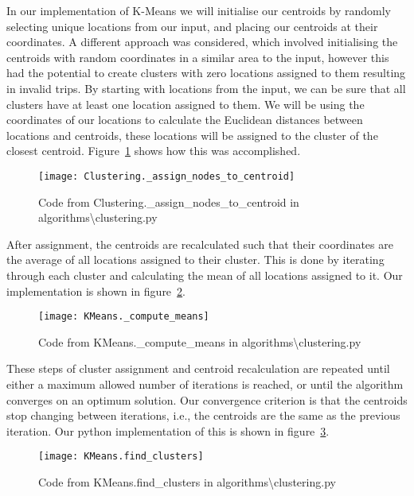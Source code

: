 \noindent
In our implementation of K-Means we will initialise our centroids by randomly selecting unique locations from our
input, and placing our centroids at their coordinates.
A different approach was considered, which involved initialising the centroids with random coordinates in a similar
area to the input, however this had the potential to create clusters with zero locations assigned to them resulting
in invalid trips.
By starting with locations from the input, we can be sure that all clusters have at least one location assigned to them.
We will be using the coordinates of our locations to calculate the Euclidean distances between locations and centroids,
these locations will be assigned to the cluster of the closest centroid.
Figure~\ref{fig:Clustering._assign_nodes_to_centroid} shows how this was accomplished.
\begin{figure}[H]
    \centering
    \texttt{[image: Clustering.\_assign\_nodes\_to\_centroid]}
    \caption{Code from Clustering.\_assign\_nodes\_to\_centroid in algorithms\textbackslash clustering.py}
    \label{fig:Clustering._assign_nodes_to_centroid}
\end{figure}

\noindent
After assignment, the centroids are recalculated such that their coordinates are the average of all locations
assigned to their cluster.
This is done by iterating through each cluster and calculating the mean of all locations assigned to it.
Our implementation is shown in figure~\ref{fig:KMeans._compute_means}.
\begin{figure}[H]
    \centering
    \texttt{[image: KMeans.\_compute\_means]}
    \caption{Code from KMeans.\_compute\_means in algorithms\textbackslash clustering.py}
    \label{fig:KMeans._compute_means}
\end{figure}

\noindent
These steps of cluster assignment and centroid recalculation are repeated until either a maximum allowed number of
iterations is reached, or until the algorithm converges on an optimum solution.
Our convergence criterion is that the centroids stop changing between iterations, i.e., the centroids are the same
as the previous iteration.
Our python implementation of this is shown in figure~\ref{fig:KMeans.find_clusters}.
\begin{figure}[H]
    \centering
    \texttt{[image: KMeans.find\_clusters]}
    \caption{Code from KMeans.find\_clusters in algorithms\textbackslash clustering.py}
    \label{fig:KMeans.find_clusters}
\end{figure}

